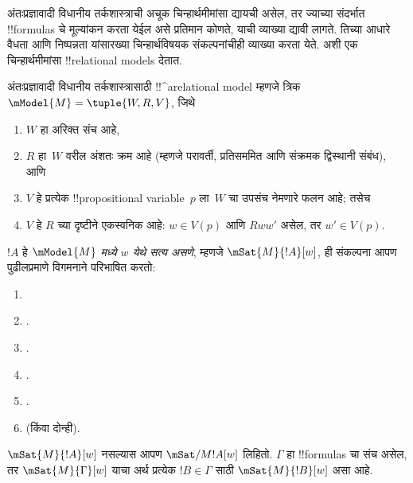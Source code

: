 \documentclass[../../../include/open-logic-section]{subfiles}
\begin{document}


अंतःप्रज्ञावादी विधानीय तर्कशास्त्राची अचूक
चिन्हार्थमीमांसा द्यायची असेल, तर ज्याच्या
संदर्भात !!{formula}s चे मूल्यांकन करता येईल
असे प्रतिमान कोणते, याची व्याख्या द्यावी लागते.
तिच्या आधारे वैधता आणि निष्पन्नता यांसारख्या
चिन्हार्थविषयक संकल्पनांचीही व्याख्या करता येते.
अशी एक चिन्हार्थमीमांसा !!{relational model}s
देतात.

\begin{defn}
  अंतःप्रज्ञावादी विधानीय तर्कशास्त्रासाठी
  !!^a{relational model} म्हणजे त्रिक
  $\mModel{M} = \tuple{W, R, V}$, जिथे
  \begin{enumerate}
  \item $W$ हा अरिक्त संच आहे,
  \item $R$ हा~$W$ वरील अंशतः क्रम आहे (म्हणजे
    परावर्ती, प्रतिसममित आणि संक्रमक द्विस्थानी संबंध), आणि
  \item $V$ हे प्रत्येक !!{propositional
    variable}~$p$ ला~$W$ चा उपसंच नेमणारे फलन आहे;
    तसेच
  \item $V$ हे $R$ च्या दृष्टीने एकस्वनिक आहे:
    $w \in V(p)$ आणि $Rww'$ असेल, तर
    $w' \in V(p)$.
  \end{enumerate}
\end{defn}

\begin{defn}
  $!A$ हे \emph{$\mModel{M}$ मध्ये $w$ येथे सत्य असणे},
  म्हणजे $\mSat{M}{!A}[w]$, ही संकल्पना आपण पुढीलप्रमाणे
  विगमनाने परिभाषित करतो:
  \begin{enumerate}
  \item {}
  \item {}.
  \item {}.
  \item {}.
  \item {}.
  \item {} (किंवा दोन्ही).
  \end{enumerate}
  $\mSat{M}{!A}[w]$ नसल्यास आपण
  $\mSat/{M}{!A}[w]$ लिहितो. $\Gamma$ हा
  !!{formula}s चा संच असेल, तर $\mSat{M}{\Gamma}[w]$
  याचा अर्थ प्रत्येक $!B \in \Gamma$ साठी
  $\mSat{M}{!B}[w]$ असा आहे.
\end{defn}
\end{document}
